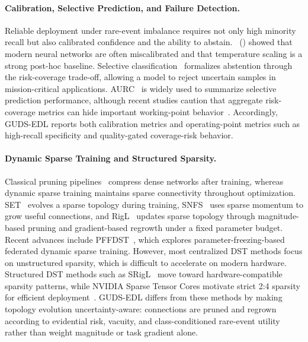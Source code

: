 \documentclass[letterpaper]{article} %
\begin{document}
\paragraph{Calibration, Selective Prediction, and Failure Detection.} Reliable deployment under rare-event imbalance requires not only high minority recall but also calibrated confidence and the ability to abstain. \citeauthor{guo2017calibration}~(\citeyear{guo2017calibration}) showed that modern neural networks are often miscalibrated and that temperature scaling is a strong post-hoc baseline. Selective classification~\cite{geifman2017selective,geifman2019selectivenet} formalizes abstention through the risk-coverage trade-off, allowing a model to reject uncertain samples in mission-critical applications. AURC~\cite{ding2020revisiting} is widely used to summarize selective prediction performance, although recent studies caution that aggregate risk-coverage metrics can hide important working-point behavior~\cite{jaeger2023call,traub2024overcoming}. Accordingly, GUDS-EDL reports both calibration metrics and operating-point metrics such as high-recall specificity and quality-gated coverage-risk behavior.

\paragraph{Dynamic Sparse Training and Structured Sparsity.} Classical pruning pipelines~\cite{han2016deep,frankle2019lottery} compress dense networks after training, whereas dynamic sparse training maintains sparse connectivity throughout optimization. SET~\cite{mocanu2018scalable} evolves a sparse topology during training, SNFS~\cite{dettmers2019sparse} uses sparse momentum to grow useful connections, and RigL~\cite{evci2020rigging} updates sparse topology through magnitude-based pruning and gradient-based regrowth under a fixed parameter budget. Recent advances include PFFDST~\cite{li2025pffdst}, which explores parameter-freezing-based federated dynamic sparse training. However, most centralized DST methods focus on unstructured sparsity, which is difficult to accelerate on modern hardware. Structured DST methods such as SRigL~\cite{lasby2023srigl} move toward hardware-compatible sparsity patterns, while NVIDIA Sparse Tensor Cores motivate strict 2:4 sparsity for efficient deployment~\cite{mishra2021accelerating}. GUDS-EDL differs from these methods by making topology evolution uncertainty-aware: connections are pruned and regrown according to evidential risk, vacuity, and class-conditioned rare-event utility rather than weight magnitude or task gradient alone.
\end{document}

